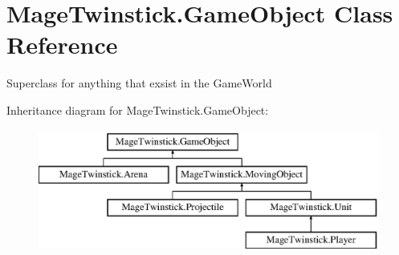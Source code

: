 \hypertarget{class_mage_twinstick_1_1_game_object}{}\section{Mage\+Twinstick.\+Game\+Object Class Reference}
\label{class_mage_twinstick_1_1_game_object}


Superclass for anything that exsist in the Game\+World  


Inheritance diagram for Mage\+Twinstick.\+Game\+Object\+:\begin{figure}[H]
\begin{center}
\leavevmode
\includegraphics[height=4.000000cm]{class_mage_twinstick_1_1_game_object}
\end{center}
\end{figure}
